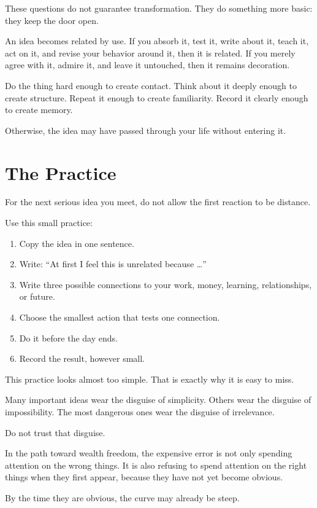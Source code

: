 These questions do not guarantee transformation. They do something more basic: they keep the door open.

An idea becomes related by use. If you absorb it, test it, write about it, teach it, act on it, and revise your behavior around it, then it is related. If you merely agree with it, admire it, and leave it untouched, then it remains decoration.

Do the thing hard enough to create contact. Think about it deeply enough to create structure. Repeat it enough to create familiarity. Record it clearly enough to create memory.

Otherwise, the idea may have passed through your life without entering it.

\section*{The Practice}

For the next serious idea you meet, do not allow the first reaction to be distance.

Use this small practice:

\begin{enumerate}
\item Copy the idea in one sentence.
\item Write: ``At first I feel this is unrelated because \ldots''
\item Write three possible connections to your work, money, learning, relationships, or future.
\item Choose the smallest action that tests one connection.
\item Do it before the day ends.
\item Record the result, however small.
\end{enumerate}

This practice looks almost too simple. That is exactly why it is easy to miss.

Many important ideas wear the disguise of simplicity. Others wear the disguise of impossibility. The most dangerous ones wear the disguise of irrelevance.

Do not trust that disguise.

In the path toward wealth freedom, the expensive error is not only spending attention on the wrong things. It is also refusing to spend attention on the right things when they first appear, because they have not yet become obvious.

By the time they are obvious, the curve may already be steep.
